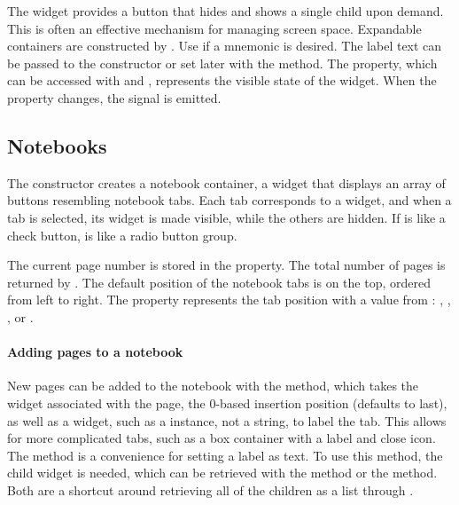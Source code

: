 The  widget provides a button that hides and shows
a single child upon demand. This is often an effective mechanism for
managing screen space. Expandable containers are constructed by
. Use  if a
mnemonic is desired. The label text can be passed to the constructor
or set later with the  method. The
 property, which can be accessed with
 and
, represents the visible state of the
widget.  When the  property changes, the
 signal is emitted.


\subsection{Notebooks}
\label{sec:RGtk2:gtkNotebook}

The  constructor creates a notebook
container, a widget that displays an array of buttons resembling
notebook tabs. Each tab corresponds to a widget, and when a tab is
selected, its widget is made visible, while the others are hidden. If
 is like a check button,  is
like a radio button group. 

The current page number is stored in the  property.  The
total number of pages is returned by .
The default position of the notebook tabs is on the top, ordered from
left to right. The property  represents the tab position
with a value from : , ,
, or .

\paragraph{Adding pages to a notebook}
New pages can be added to the notebook with the
 method, which takes the widget
associated with the page, the $0$-based insertion position (defaults
to last), as well as
a widget, such as a  instance, not a string, to label
the tab. This allows for more complicated tabs, such as a box
container with a label and close icon. The
 method is a convenience for
setting a label as text.  To use this method, the child widget is
needed, which can be retrieved with the \method{[[}{GObject}
method or the  method. Both are a
shortcut around retrieving all of the children as a list through
. 

